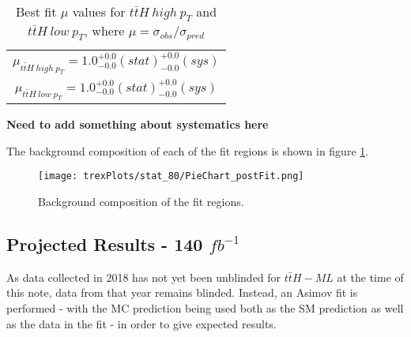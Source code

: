 \begin{table}[H]                                                                                                             
  \centering                                                                                                              
  \begin{tabular}{c}                                                                                            
     $\mu_{t\bar{t}H\ high\ p_T} = 1.0^{+0.0}_{-0.0}(stat)^{+0.0}_{-0.0}(sys)$ \\       
     $\mu_{t\bar{t}H\ low\ p_T} = 1.0^{+0.0}_{-0.0}(stat)^{+0.0}_{-0.0}(sys)$ \\
  \end{tabular}                                                                                                            
  \caption{Best fit $\mu$ values for $t\bar{t}H\ high\ p_T$ and  $t\bar{t}H\ low\ p_T$, where $\mu = \sigma_{obs}/\sigma_{pred}$}
  \label{tab:mu80}                                                                                                  
\end{table}  

\textbf{Need to add something about systematics here}

The background composition of each of the fit regions is shown in figure \ref{fig:pieChart80}.

\begin{figure}[h!]
    \centering
    \texttt{[image: trexPlots/stat\_80/PieChart\_postFit.png]}
    \caption{Background composition of the fit regions.}
    \label{fig:pieChart80}
\end{figure} 


\subsection{Projected Results - 140 $fb^{-1}$}   
\label{sec:res140}

As data collected in 2018 has not yet been unblinded for $t\bar{t}H-ML$ at the time of this note, data from that year remains blinded. Instead, an Asimov fit is performed - with the MC prediction being used both as the SM prediction as well as the data in the fit - in order to give expected results.

